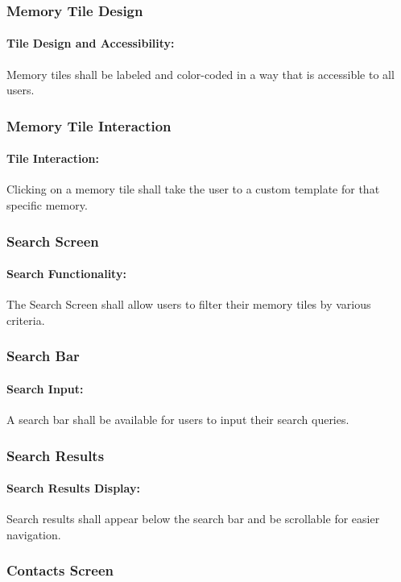 \documentclass{article}
\begin{document}
\subsubsection*{Memory Tile Design}
\addtocounter{subsubsection}{1}
\paragraph{Tile Design and Accessibility:} Memory tiles shall be labeled and color-coded in a way that is accessible to all users.
\subsubsection*{Memory Tile Interaction}
\addtocounter{subsubsection}{1}
\paragraph{Tile Interaction:} Clicking on a memory tile shall take the user to a custom template for that specific memory.
\subsubsection*{Search Screen}
\addtocounter{subsubsection}{1}
\paragraph{Search Functionality:} The Search Screen shall allow users to filter their memory tiles by various criteria.
\subsubsection*{Search Bar}
\addtocounter{subsubsection}{1}
\paragraph{Search Input:} A search bar shall be available for users to input their search queries.
\subsubsection*{Search Results}
\addtocounter{subsubsection}{1}
\paragraph{Search Results Display:} Search results shall appear below the search bar and be scrollable for easier navigation.
\subsubsection*{Contacts Screen}
\addtocounter{subsubsection}{1}
\end{document}

